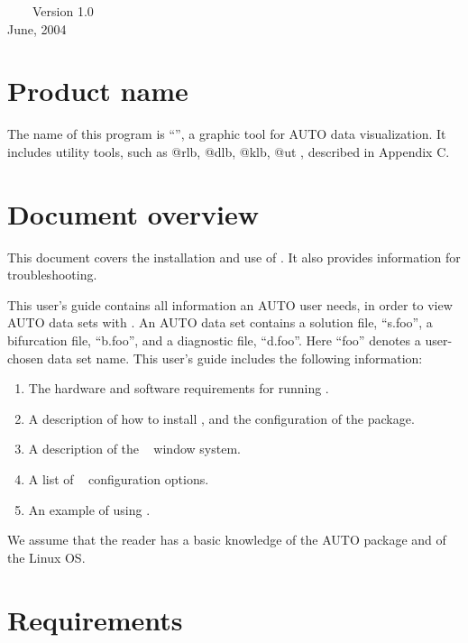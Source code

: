 

~~~~Version 1.0\\

June, 2004\\

\section{Product name}
The name of this program is ``\PLAUT'', a graphic
tool for AUTO data visualization. 
It includes utility tools, such as @rlb, @dlb, @klb, @ut \ETC, described in Appendix C.

\section{Document overview}
This document covers the installation and use of \PLAUT. 
It also provides information for troubleshooting. 

This user's guide contains all information an AUTO user needs, in order to 
view AUTO data sets with \PLAUT. An AUTO data set contains a solution file, ``s.foo'', 
a bifurcation file, ``b.foo'', and a diagnostic file, ``d.foo''. Here ``foo'' denotes a user-chosen data set name. 
This user's guide includes the following information:
\begin{enumerate}
    \item The hardware and software requirements for running \PLAUT.
    \item A description of how to install \PLAUT, and the configuration of the package.
    \item A description of the \PLAUT~ window system.
    \item A list of \PLAUT~ configuration options.
    \item An example of using \PLAUT.
\end{enumerate}

We assume that the reader has a basic knowledge of the AUTO package and of the Linux OS. 

\section{Requirements}

